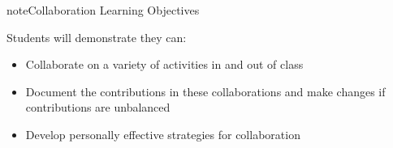 \documentclass[letterpaper,10pt,english]{jupyterBook}
\begin{document}
\begin{sphinxadmonition}{note}{Collaboration Learning Objectives}

\sphinxAtStartPar
Students will demonstrate they can:
\begin{itemize}
\item {} 
\sphinxAtStartPar
Collaborate on a variety of activities in and out of class

\item {} 
\sphinxAtStartPar
Document the contributions in these collaborations and make changes if contributions are unbalanced

\item {} 
\sphinxAtStartPar
Develop personally effective strategies for collaboration

\end{itemize}
\end{sphinxadmonition}

\sphinxstepscope
\end{document}
